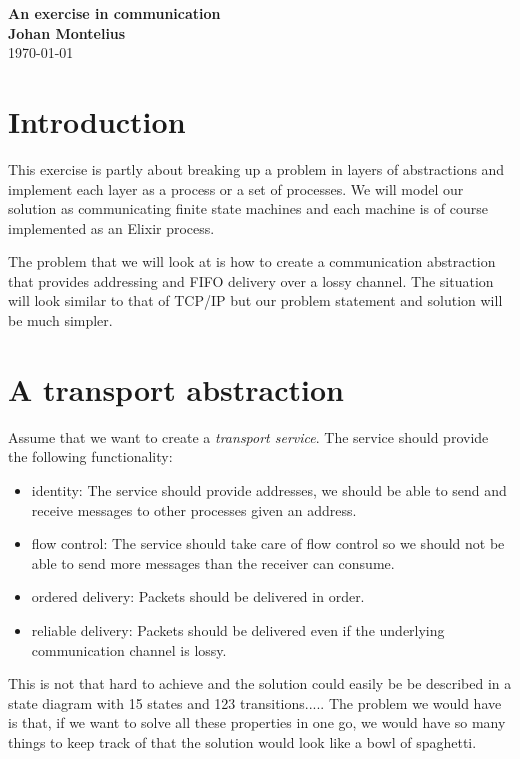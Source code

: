 \documentclass[a4paper,11pt]{article}
\newcommand{\nnsection}[1]{
\section*{#1}
\addcontentsline{toc}{section}{#1}
}
\begin{document}
\begin{center}
\vspace{20pt}
\textbf{\large An exercise in communication}\\
\vspace{10pt}
\textbf{Johan Montelius}\\
\vspace{10pt}
\today{}
\end{center}

\nnsection{Introduction}

This exercise is partly about breaking up a problem in layers of
abstractions and implement each layer as a process or a set of
processes. We will model our solution as communicating finite state
machines and each machine is of course implemented as an Elixir
process.

The problem that we will look at is how to create a communication
abstraction that provides addressing and FIFO delivery over a lossy
channel. The situation will look similar to that of TCP/IP but our
problem statement and solution will be much simpler.

\section{A transport abstraction}

Assume that we want to create a {\em transport service}. The service
should provide the following functionality:

\begin{itemize}

\item identity: The service should provide addresses, we should
  be able to send and receive messages to other processes given an
  address.

\item flow control: The service should take care of flow control so
  we should not be able to send more messages than the receiver can
  consume.

\item ordered delivery: Packets should be delivered in order.

\item reliable delivery: Packets should be delivered even if the
  underlying communication channel is lossy.

\end{itemize}

This is not that hard to achieve and the solution could easily be be
described in a state diagram with 15 states and 123
transitions..... The problem we would have is that, if we want to solve
all these properties in one go, we would have so many things to keep
track of that the solution would look like a bowl of spaghetti.
\end{document}
